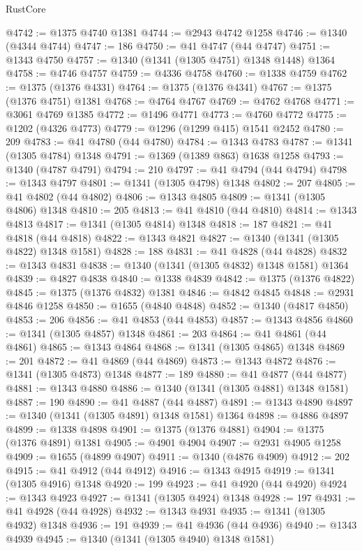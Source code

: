 \begin{lexlean}{RustCore}
\begin{coremodule}
@4742 := @1375 @4740 @1381
@4744 := @2943 @4742 @1258
@4746 := @1340 (@4344 @4744)
@4747 := 186
@4750 := @41 @4747 (@44 @4747)
@4751 := @1343 @4750
@4757 := @1340 (@1341 (@1305 @4751) @1348 @1448) @1364
@4758 := @4746 @4757
@4759 := @4336 @4758
@4760 := @1338 @4759
@4762 := @1375 (@1376 @4331)
@4764 := @1375 (@1376 @4341)
@4767 := @1375 (@1376 @4751) @1381
@4768 := @4764 @4767
@4769 := @4762 @4768
@4771 := @3061 @4769 @1385
@4772 := @1496 @4771
@4773 := @4760 @4772
@4775 := @1202 (@4326 @4773)
@4779 := @1296 (@1299 @415) @1541 @2452
@4780 := 209
@4783 := @41 @4780 (@44 @4780)
@4784 := @1343 @4783
@4787 := @1341 (@1305 @4784) @1348
@4791 := @1369 (@1389 @863) @1638 @1258
@4793 := @1340 (@4787 @4791)
@4794 := 210
@4797 := @41 @4794 (@44 @4794)
@4798 := @1343 @4797
@4801 := @1341 (@1305 @4798) @1348
@4802 := 207
@4805 := @41 @4802 (@44 @4802)
@4806 := @1343 @4805
@4809 := @1341 (@1305 @4806) @1348
@4810 := 205
@4813 := @41 @4810 (@44 @4810)
@4814 := @1343 @4813
@4817 := @1341 (@1305 @4814) @1348
@4818 := 187
@4821 := @41 @4818 (@44 @4818)
@4822 := @1343 @4821
@4827 := @1340 (@1341 (@1305 @4822) @1348 @1581)
@4828 := 188
@4831 := @41 @4828 (@44 @4828)
@4832 := @1343 @4831
@4838 := @1340 (@1341 (@1305 @4832) @1348 @1581) @1364
@4839 := @4827 @4838
@4840 := @1338 @4839
@4842 := @1375 (@1376 @4822)
@4845 := @1375 (@1376 @4832) @1381
@4846 := @4842 @4845
@4848 := @2931 @4846 @1258
@4850 := @1655 (@4840 @4848)
@4852 := @1340 (@4817 @4850)
@4853 := 206
@4856 := @41 @4853 (@44 @4853)
@4857 := @1343 @4856
@4860 := @1341 (@1305 @4857) @1348
@4861 := 203
@4864 := @41 @4861 (@44 @4861)
@4865 := @1343 @4864
@4868 := @1341 (@1305 @4865) @1348
@4869 := 201
@4872 := @41 @4869 (@44 @4869)
@4873 := @1343 @4872
@4876 := @1341 (@1305 @4873) @1348
@4877 := 189
@4880 := @41 @4877 (@44 @4877)
@4881 := @1343 @4880
@4886 := @1340 (@1341 (@1305 @4881) @1348 @1581)
@4887 := 190
@4890 := @41 @4887 (@44 @4887)
@4891 := @1343 @4890
@4897 := @1340 (@1341 (@1305 @4891) @1348 @1581) @1364
@4898 := @4886 @4897
@4899 := @1338 @4898
@4901 := @1375 (@1376 @4881)
@4904 := @1375 (@1376 @4891) @1381
@4905 := @4901 @4904
@4907 := @2931 @4905 @1258
@4909 := @1655 (@4899 @4907)
@4911 := @1340 (@4876 @4909)
@4912 := 202
@4915 := @41 @4912 (@44 @4912)
@4916 := @1343 @4915
@4919 := @1341 (@1305 @4916) @1348
@4920 := 199
@4923 := @41 @4920 (@44 @4920)
@4924 := @1343 @4923
@4927 := @1341 (@1305 @4924) @1348
@4928 := 197
@4931 := @41 @4928 (@44 @4928)
@4932 := @1343 @4931
@4935 := @1341 (@1305 @4932) @1348
@4936 := 191
@4939 := @41 @4936 (@44 @4936)
@4940 := @1343 @4939
@4945 := @1340 (@1341 (@1305 @4940) @1348 @1581)

\end{coremodule}
\end{lexlean}
